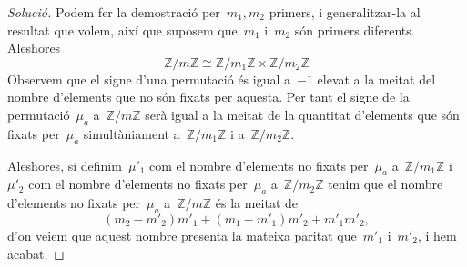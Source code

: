 \documentclass[a4paper]{article}
\newcommand{\ZZ}{\mathbb{Z}}
\newenvironment{solution}{
    \renewcommand\qedsymbol{\ensuremath{\lozenge}}
    \begin{proof}[Solució]
        }{
    \end{proof}
}
\begin{document}
\begin{solution}
    Podem fer la demostració per~\(m_{1},m_{2}\) primers, i generalitzar-la al
    resultat que volem, així que suposem que~\(m_{1}\) i~\(m_{2}\) són primers
    diferents. Aleshores
    \[
        \ZZ/m\ZZ
        \cong
        \ZZ/m_{1}\ZZ\times\ZZ/m_{2}\ZZ
    \]
    Observem que el signe d'una permutació és igual a~\(-1\) elevat a la meitat
    del nombre d'elements que no són fixats per aquesta. Per tant el signe de la
    permutació~\(\mu_{a}\) a~\(\ZZ/m\ZZ\) serà igual a la meitat de la quantitat
    d'elements que són fixats per~\(\mu_{a}\) simultàniament a~\(\ZZ/m_{1}\ZZ\)
    i a~\(\ZZ/m_{2}\ZZ\).

    Aleshores, si definim~\(\mu'_{1}\) com el nombre d'elements no fixats
    per~\(\mu_{a}\) a~\(\ZZ/m_{1}\ZZ\) i~\(\mu'_{2}\) com el nombre d'elements
    no fixats per~\(\mu_{a}\) a~\(\ZZ/m_{2}\ZZ\) tenim que el nombre d'elements
    no fixats per~\(\mu_{a}\) a~\(\ZZ/m\ZZ\) és la meitat de
    \[
        (m_{2}-m'_{2})m'_{1} + (m_{1}-m'_{1})m'_{2} + m'_{1}m'_{2},
    \]
    d'on veiem que aquest nombre presenta la mateixa paritat que~\(m'_{1}\)
    i~\(m'_{2}\), i hem acabat.
\end{solution}
\end{document}
